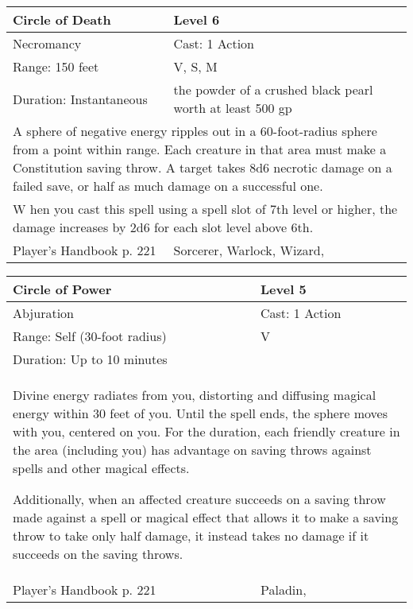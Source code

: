 \documentclass[11pt]{report}
\begin{document}
\begin{table}[H]
	\begin{tabular}{||p{6cm}|p{6cm}||}
		\hline\hline
		\bf{Circle of Death} & Level 6\\ \hline
		Necromancy & Cast: 1 Action\\ \hline
		Range: 150 feet & V, S, M \\ \hline
		Duration: Instantaneous & the powder of a crushed black pearl worth at least 500 gp\\ \hline
		\multicolumn{2}{||p{12cm}||}{A sphere of negative energy ripples out in a 60-foot-radius sphere from a point within range. Each creature in that area must make a Constitution saving throw. A target takes 8d6 necrotic damage on a failed save, or half as much damage on a successful one.}\\ \hline
		\multicolumn{2}{||p{12cm}||}{W hen you cast this spell using a spell slot of 7th level or higher, the damage increases by 2d6 for each slot level above 6th.}\\ \hline
Player's Handbook p. 221 & Sorcerer, Warlock, Wizard, \\ \hline\hline
	\end{tabular}
\end{table}

\begin{table}[H]
	\begin{tabular}{||p{6cm}|p{6cm}||}
		\hline\hline
		\bf{Circle of Power} & Level 5\\ \hline
		Abjuration & Cast: 1 Action\\ \hline
		Range: Self (30-foot radius) & V\\ \hline
		Duration: Up to 10 minutes & \\ \hline
		\multicolumn{2}{||p{12cm}||}{Divine energy radiates from you, distorting and diffusing magical energy within 30 feet of you. 
Until the spell ends, the sphere moves with you, centered on you. For the duration, each friendly creature in the area (including you) has advantage on saving throws against spells and other magical effects. 

Additionally, when an affected creature succeeds on a saving throw made against a spell or magical effect that allows it to make a saving throw to take only half damage, it instead takes no damage if it succeeds on the saving throws.}\\ \hline
Player's Handbook p. 221 & Paladin, \\ \hline\hline
	\end{tabular}
\end{table}
\end{document}
